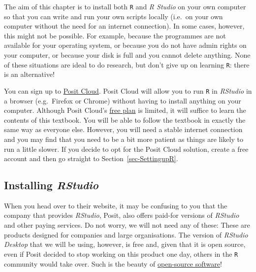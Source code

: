 \documentclass[
  letterpaper,
  DIV=11,
  numbers=noendperiod]{scrreprt}
\begin{document}
\begin{tcolorbox}[enhanced jigsaw, arc=.35mm, bottomrule=.15mm, bottomtitle=1mm, breakable, colback=white, colbacktitle=quarto-callout-note-color!10!white, colframe=quarto-callout-note-color-frame, coltitle=black, left=2mm, leftrule=.75mm, opacityback=0, opacitybacktitle=0.6, rightrule=.15mm, title=\textcolor{quarto-callout-note-color}{\faInfo}\hspace{0.5em}{What to do if you cannot get R and/or \emph{RStudio} working on your
computer}, titlerule=0mm, toprule=.15mm, toptitle=1mm]

The aim of this chapter is to install both \texttt{R} and \emph{R
Studio} on your own computer so that you can write and run your own
scripts locally (i.e.~on your own computer without the need for an
internet connection). In some cases, however, this might not be
possible. For example, because the programmes are not available for your
operating system, or because you do not have admin rights on your
computer, or because your disk is full and you cannot delete anything.
None of these situations are ideal to do research, but don't give up on
learning \texttt{R}: there is an alternative!

You can sign up to \href{https://posit.co/products/cloud/cloud/}{Posit
Cloud}. Posit Cloud will allow you to run \texttt{R} in \emph{RStudio}
in a browser (e.g.~Firefox or Chrome) without having to install anything
on your computer. Although Posit Cloud's
\href{https://posit.cloud/plans/free}{free plan} is limited, it will
suffice to learn the contents of this textbook. You will be able to
follow the textbook in exactly the same way as everyone else. However,
you will need a stable internet connection and you may find that you
need to be a bit more patient as things are likely to run a little
slower. If you decide to opt for the Posit Cloud solution, create a free
account and then go straight to Section~\ref{sec-SettingupR}.

\end{tcolorbox}

\subsection{\texorpdfstring{Installing
\emph{RStudio}}{Installing RStudio}}\label{sec-installingRStudio}

When you head over to their website, it may be confusing to you that the
company that provides \emph{RStudio}, Posit, also offers paid-for
versions of \emph{RStudio} and other paying services. Do not worry, we
will not need any of these: These are products designed for companies
and large organisations. The version of \emph{RStudio Desktop} that we
will be using, however, is free and, given that it is open source, even
if Posit decided to stop working on this product one day, others in the
\texttt{R} community would take over. Such is the beauty of
\href{https://elenlefoll.github.io/RstatsTextbook/OpenScholarship.html}{open-source
software}! 
\end{document}
